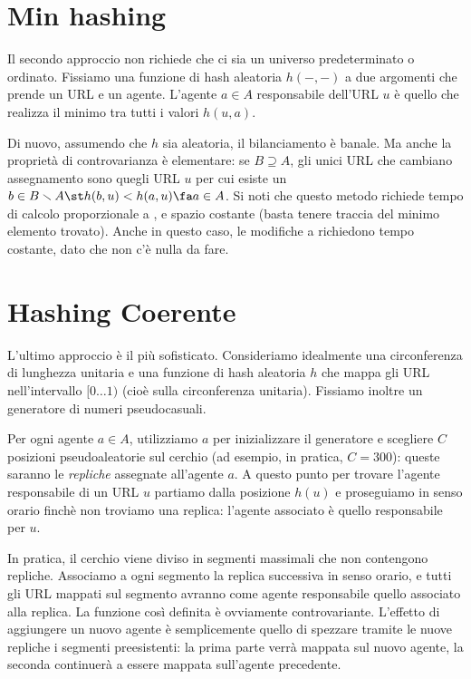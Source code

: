 \section{Min hashing}
Il secondo approccio non richiede che ci sia un universo predeterminato o ordinato. Fissiamo una funzione di hash aleatoria $h(-, -)$ a due argomenti che prende un URL e un agente. L'agente $a \in A$ responsabile dell'URL $u$ è quello che realizza il minimo tra tutti i valori $h(u, a)$.

Di nuovo, assumendo che $h$ sia aleatoria, il bilanciamento è banale. Ma anche la proprietà di controvarianza è elementare: se $B \supseteq A$, gli unici URL che cambiano assegnamento sono quegli URL $u$ per cui esiste un $b \in B \smallsetminus A \st h(b, u) < h(a, u) \fa a \in A$.
Si noti che questo metodo richiede tempo di calcolo proporzionale a , e spazio costante (basta tenere traccia del minimo elemento trovato). Anche in questo caso, le modifiche a  richiedono tempo costante, dato che non c'è nulla da fare.
\section{Hashing Coerente}
L'ultimo approccio è il più sofisticato. Consideriamo idealmente una circonferenza di lunghezza unitaria e una funzione di hash aleatoria $h$ che mappa gli URL nell'intervallo $[0\dots1)$ (cioè sulla circonferenza unitaria). Fissiamo inoltre un generatore di numeri pseudocasuali.

Per ogni agente $a \in A$, utilizziamo $a$ per inizializzare il generatore e scegliere $C$ posizioni pseudoaleatorie sul cerchio (ad esempio, in pratica, $C = 300$): queste saranno le \textit{repliche} assegnate all'agente $a$. A questo punto per trovare l'agente responsabile di un URL $u$ partiamo dalla posizione $h(u)$ e proseguiamo in senso orario finchè non troviamo una replica: l'agente associato è quello responsabile per $u$.

In pratica, il cerchio viene diviso in segmenti massimali che non contengono repliche. Associamo a ogni segmento la replica successiva in senso orario, e tutti gli URL mappati sul segmento avranno come agente responsabile quello associato alla replica. La funzione così definita è ovviamente controvariante. L'effetto di aggiungere un nuovo agente è semplicemente quello di spezzare tramite le nuove repliche i segmenti preesistenti: la prima parte verrà mappata sul nuovo agente, la seconda continuerà a essere mappata sull'agente precedente.

